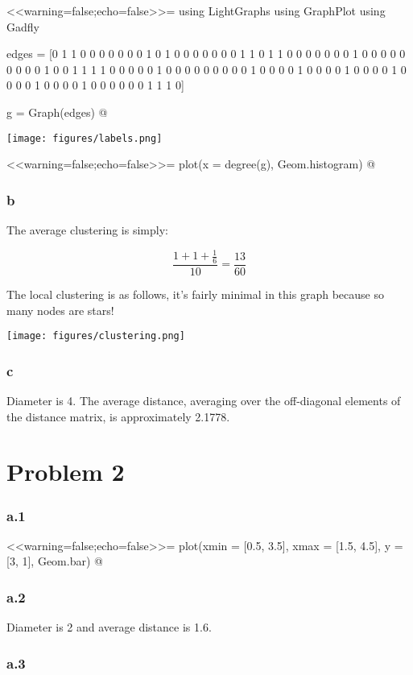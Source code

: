 \documentclass[a4paper,12pt]{article}
\begin{document}
<<warning=false;echo=false>>=
using LightGraphs
using GraphPlot
using Gadfly

edges = [0 1 1 0 0 0 0 0 0 0
         1 0 1 0 0 0 0 0 0 0
         1 1 0 1 1 0 0 0 0 0
         0 0 1 0 0 0 0 0 0 0
         0 0 1 0 0 1 1 1 1 0
         0 0 0 0 1 0 0 0 0 0
         0 0 0 0 1 0 0 0 0 1
         0 0 0 0 1 0 0 0 0 1
         0 0 0 0 1 0 0 0 0 1
         0 0 0 0 0 0 1 1 1 0]


g = Graph(edges)
@

\texttt{[image: figures/labels.png]}

<<warning=false;echo=false>>=
plot(x = degree(g), Geom.histogram)
@

\subsubsection*{b}

The average clustering is simply:

$$
\frac{1 + 1 + \frac{1}{6}}{10} = \frac{13}{60}
$$

The local clustering is as follows, it's fairly minimal in this graph because so many nodes are stars!

\texttt{[image: figures/clustering.png]}

\subsubsection*{c}

Diameter is 4. The average distance, averaging over the off-diagonal elements of the distance matrix, is approximately 2.1778.


\section*{Problem 2}

\subsubsection*{a.1}
<<warning=false;echo=false>>=
plot(xmin = [0.5, 3.5], xmax = [1.5, 4.5], y = [3, 1], Geom.bar)
@

\subsubsection*{a.2}
Diameter is 2 and average distance is 1.6.

\subsubsection*{a.3}
\end{document}
